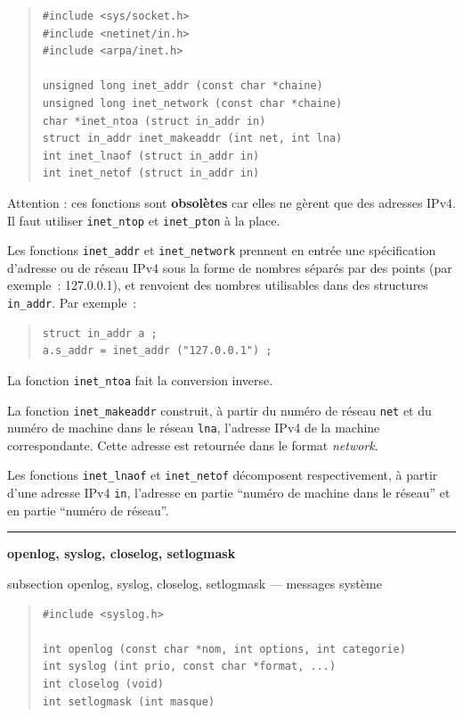 \documentclass [twoside] {report}
\newcommand {\primitive} [1]
    {
	\phantomsection
	{\large \textbf {#1}}
	\addcontentsline {toc} {subsection} {#1}
    }
\newcommand {\separation}
    {
	\vspace {5mm}
	\nopagebreak
	\hrule
    }
\begin{document}
\begin {quote}
\begin {verbatim}
#include <sys/socket.h>
#include <netinet/in.h>
#include <arpa/inet.h>

unsigned long inet_addr (const char *chaine)
unsigned long inet_network (const char *chaine)
char *inet_ntoa (struct in_addr in)
struct in_addr inet_makeaddr (int net, int lna)
int inet_lnaof (struct in_addr in)
int inet_netof (struct in_addr in)
\end{verbatim}
\end {quote}

Attention : ces fonctions sont \textbf {obsolètes} car elles ne gèrent que
des adresses IPv4. Il faut utiliser \texttt {inet\_ntop} et \texttt
{inet\_pton} à la place.

Les fonctions \texttt {inet\_addr} et \texttt {inet\_network} prennent en entrée
une spécification d'adresse ou de réseau IPv4 sous la forme de nombres
séparés par des points (par exemple~: 127.0.0.1), et renvoient des
nombres utilisables dans des structures \texttt {in\_addr}. Par exemple~:

\begin {quote}
\begin {verbatim}
struct in_addr a ;
a.s_addr = inet_addr ("127.0.0.1") ;
\end{verbatim}
\end {quote}

La fonction \texttt {inet\_ntoa} fait la conversion inverse.

La fonction \texttt {inet\_makeaddr} construit, à partir du numéro de réseau
\texttt {net} et du numéro de machine dans le réseau \texttt {lna}, l'adresse IPv4
de la machine correspondante. Cette adresse est retournée dans le format
\emph {network}.

Les fonctions \texttt {inet\_lnaof} et \texttt {inet\_netof} décomposent
respectivement, à partir d'une adresse IPv4 \texttt {in}, l'adresse en partie
``numéro de machine dans le réseau'' et en partie ``numéro de réseau''.



\separation
\primitive {openlog, syslog, closelog, setlogmask} --- messages système

\begin {quote}
\begin {verbatim}
#include <syslog.h>

int openlog (const char *nom, int options, int categorie)
int syslog (int prio, const char *format, ...)
int closelog (void)
int setlogmask (int masque)
\end{verbatim}
\end {quote}
\end{document}

